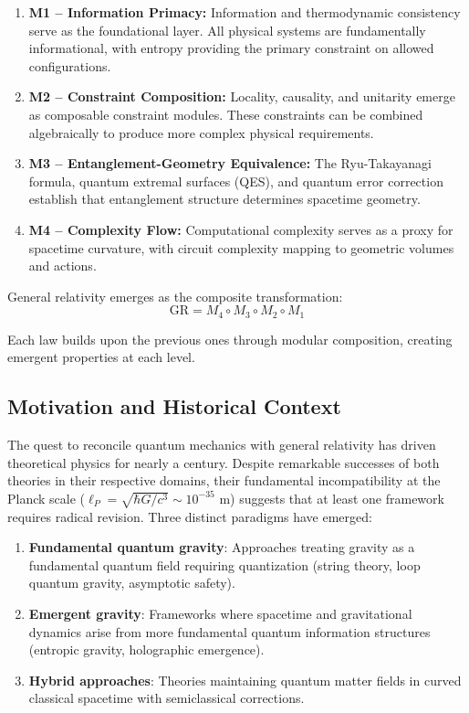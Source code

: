 \documentclass[11pt,a4paper]{article}
\theoremstyle{remark}
\theoremstyle{definition}
\begin{document}
\begin{enumerate}
\item \textbf{M1 -- Information Primacy:} Information and thermodynamic consistency serve as the foundational layer. All physical systems are fundamentally informational, with entropy providing the primary constraint on allowed configurations.

\item \textbf{M2 -- Constraint Composition:} Locality, causality, and unitarity emerge as composable constraint modules. These constraints can be combined algebraically to produce more complex physical requirements.

\item \textbf{M3 -- Entanglement-Geometry Equivalence:} The Ryu-Takayanagi formula, quantum extremal surfaces (QES), and quantum error correction establish that entanglement structure determines spacetime geometry.

\item \textbf{M4 -- Complexity Flow:} Computational complexity serves as a proxy for spacetime curvature, with circuit complexity mapping to geometric volumes and actions.
\end{enumerate}

General relativity emerges as the composite transformation:
\begin{equation}
\text{GR} = M_4 \circ M_3 \circ M_2 \circ M_1
\end{equation}

Each law builds upon the previous ones through modular composition, creating emergent properties at each level.

\subsection{Motivation and Historical Context}

The quest to reconcile quantum mechanics with general relativity has driven theoretical physics for nearly a century. Despite remarkable successes of both theories in their respective domains, their fundamental incompatibility at the Planck scale ($\ell_P = \sqrt{\hbar G/c^3} \sim 10^{-35}$ m) suggests that at least one framework requires radical revision. Three distinct paradigms have emerged:

\begin{enumerate}
\item \textbf{Fundamental quantum gravity}: Approaches treating gravity as a fundamental quantum field requiring quantization (string theory, loop quantum gravity, asymptotic safety).
\item \textbf{Emergent gravity}: Frameworks where spacetime and gravitational dynamics arise from more fundamental quantum information structures (entropic gravity, holographic emergence).
\item \textbf{Hybrid approaches}: Theories maintaining quantum matter fields in curved classical spacetime with semiclassical corrections.
\end{enumerate}
\end{document}
